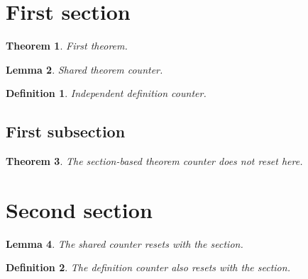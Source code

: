 \documentclass{article}
\newtheorem{theorem}{Theorem}[section]
\newtheorem{lemma}[theorem]{Lemma}
\newtheorem{definition}{Definition}[section]
\begin{document}
\section{First section}\label{sec:first}

\begin{theorem}\label{thm:first}
First theorem.
\end{theorem}

\begin{lemma}\label{lem:first}
Shared theorem counter.
\end{lemma}

\begin{definition}\label{def:first}
Independent definition counter.
\end{definition}

\subsection{First subsection}\label{subsec:first}

\begin{theorem}\label{thm:after-subsection}
The section-based theorem counter does not reset here.
\end{theorem}

\section{Second section}\label{sec:second}

\begin{lemma}\label{lem:second}
The shared counter resets with the section.
\end{lemma}

\begin{definition}\label{def:second}
The definition counter also resets with the section.
\end{definition}
\end{document}
